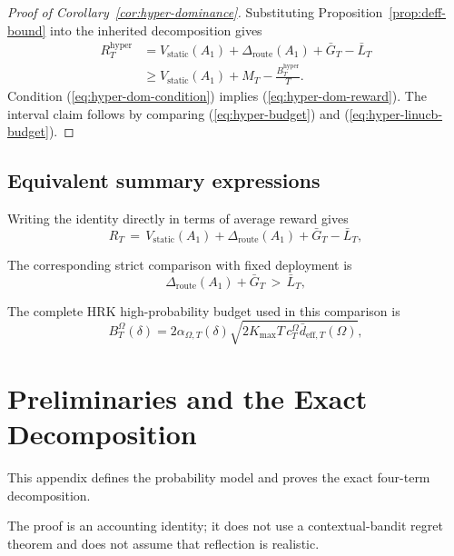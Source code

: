 \documentclass{article} %
\renewcommand{\eqref}[1]{\textup{(\ref{#1})}}
\begin{document}
\begin{proof}[Proof of Corollary~\ref{cor:hyper-dominance}]
Substituting Proposition~\ref{prop:deff-bound} into the inherited decomposition gives
\begin{equation}
\label{eq:hyper-cor-proof}
\begin{aligned}
R_T^{\mathrm{hyper}}
&=
V_{\mathrm{static}}(A_1)
+
\Delta_{\mathrm{route}}(A_1)
+
\bar G_T
-
\bar L_T
\\
&\ge
V_{\mathrm{static}}(A_1)
+
M_T
-
\frac{B_T^{\mathrm{hyper}}}{T}.
\end{aligned}
\end{equation}
Condition \eqref{eq:hyper-dom-condition} implies \eqref{eq:hyper-dom-reward}. The interval claim follows by comparing \eqref{eq:hyper-budget} and \eqref{eq:hyper-linucb-budget}.
\end{proof}

\subsection{Equivalent summary expressions}

Writing the identity directly in terms of average reward gives
\begin{equation}
\label{eq:intro-decomp}
R_T
\,=\,
V_{\mathrm{static}}(A_1)
+
\Delta_{\mathrm{route}}(A_1)
+
\bar G_T
-
\bar L_T ,
\end{equation}

The corresponding strict comparison with fixed deployment is
\begin{equation}
\label{eq:intro-dominance}
\Delta_{\mathrm{route}}(A_1) + \bar G_T \,>\, \bar L_T ,
\end{equation}

The complete HRK high-probability budget used in this comparison is
\begin{equation}
\label{eq:intro-hyper-cost}
B_T^\Omega(\delta)
=
2\alpha_{\Omega,T}(\delta)
\sqrt{2K_{\max}T\,c_T^\Omega\bar d_{\mathrm{eff},T}(\Omega)},
\end{equation}

\section{Preliminaries and the Exact Decomposition}

\label{app:proofs}

This appendix defines the probability model and proves the exact four-term decomposition.

The proof is an accounting identity; it does not use a contextual-bandit regret theorem and does not assume that reflection is realistic.
\end{document}
